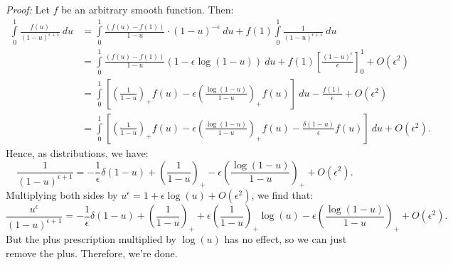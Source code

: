 \documentclass[withindex,glossary]{cam-thesis}
\begin{document}
\noindent \textit{Proof:} Let $f$ be an arbitrary smooth function. Then:
\begin{align}
\int\limits_{0}^{1} \frac{f(u)}{(1-u)^{\epsilon + 1}}\ du &= \int\limits_{0}^{1} \frac{(f(u) - f(1))}{1-u} \cdot (1-u)^{-\epsilon}\ du + f(1) \int\limits_{0}^{1} \frac{1}{(1-u)^{\epsilon + 1}}\ du\\[1.5ex]
&= \int\limits_{0}^{1} \frac{(f(u) - f(1))}{1-u} (1 - \epsilon \log(1-u))\ du + f(1) \left[ \frac{(1-u)^{\epsilon}}{\epsilon} \right]^{1}_{0} + O(\epsilon^2)\\[1.5ex]
&= \int\limits_{0}^{1} \left[ \left( \frac{1}{1-u} \right)_+ f(u) - \epsilon \left( \frac{\log(1-u)}{1-u} \right)_+ f(u) \right]\ du - \frac{f(1)}{\epsilon} + O(\epsilon^2)\\[1.5ex]
&= \int\limits_{0}^{1} \left[ \left( \frac{1}{1-u} \right)_+ f(u) - \epsilon \left( \frac{\log(1-u)}{1-u} \right)_+ f(u) - \frac{\delta(1-u)}{\epsilon} f(u) \right]\ du + O(\epsilon^2).
\end{align}
Hence, as distributions, we have:
\begin{equation}
\frac{1}{(1-u)^{\epsilon+1}} = -\frac{1}{\epsilon} \delta(1-u) + \left( \frac{1}{1-u} \right)_+ - \epsilon \left( \frac{\log(1-u)}{1-u} \right)_+ + O(\epsilon^2).
\end{equation}
Multiplying both sides by $u^{\epsilon} = 1 + \epsilon \log(u) + O(\epsilon^2)$, we find that:
\begin{equation}
\frac{u^{\epsilon}}{(1-u)^{\epsilon+1}} = -\frac{1}{\epsilon} \delta(1-u) + \left( \frac{1}{1-u} \right)_+ + \epsilon \left( \frac{1}{1-u} \right)_+ \log(u) - \epsilon \left( \frac{\log(1-u)}{1-u} \right)_+ + O(\epsilon^2).
\end{equation}
But the plus prescription multiplied by $\log(u)$ has no effect, so we can just remove the plus. Therefore, we're done. \qedsymbol\\
\end{document}
